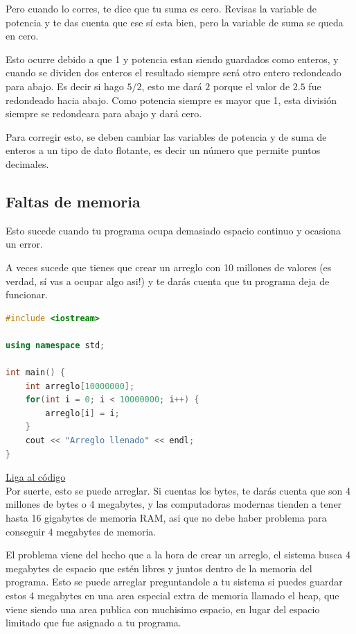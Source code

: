 \documentclass{article}
\begin{document}
Pero cuando lo corres, te dice que tu suma es cero. Revisas la variable de potencia y te das cuenta que ese sí esta bien, pero la variable de suma se queda en cero.

Esto ocurre debido a que 1 y potencia estan siendo guardados como enteros, y cuando se dividen dos enteros el resultado siempre será otro entero redondeado para abajo. Es decir si hago $5 / 2$, esto me dará $2$ porque el valor de $2.5$ fue redondeado hacia abajo. Como potencia siempre es mayor que 1, esta división siempre se redondeara para abajo y dará cero.

Para corregir esto, se deben cambiar las variables de potencia y de suma de enteros a un tipo de dato flotante, es decir un número que permite puntos decimales.

\subsection{Faltas de memoria}
Esto sucede cuando tu programa ocupa demasiado espacio continuo y ocasiona un error.

A veces sucede que tienes que crear un arreglo con 10 millones de valores (es verdad, sí vas a ocupar algo asi!) y te darás cuenta que tu programa deja de funcionar.

\begin{lstlisting}[language=C++, caption=Faltas de memoria]
#include <iostream>

using namespace std;

int main() {
    int arreglo[10000000];
    for(int i = 0; i < 10000000; i++) {
        arreglo[i] = i;
    }
    cout << "Arreglo llenado" << endl;
}
\end{lstlisting}
\href{https://repl.it/@Jamesscn/Arreglo-no-arreglado}{Liga al código}\\

Por suerte, esto se puede arreglar. Si cuentas los bytes, te darás cuenta que son 4 millones de bytes o 4 megabytes, y las computadoras modernas tienden a tener hasta 16 gigabytes de memoria RAM, asi que no debe haber problema para conseguir 4 megabytes de memoria.

El problema viene del hecho que a la hora de crear un arreglo, el sistema busca 4 megabytes de espacio que estén libres y juntos dentro de la memoria del programa. Esto se puede arreglar preguntandole a tu sistema si puedes guardar estos 4 megabytes en una area especial extra de memoria llamado el heap, que viene siendo una area publica con muchisimo espacio, en lugar del espacio limitado que fue asignado a tu programa.
\end{document}
